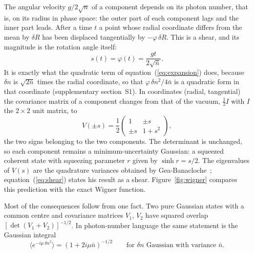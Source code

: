 \documentclass{iopjournal}
\newcommand{\nbar}{\bar{n}}
\begin{document}
The angular velocity $g/2\sqrt{n}$ of a component depends on its photon number, that is, on its radius in phase space: the outer part of each component lags and the inner part leads. After a time $t$ a point whose radial coordinate differs from the mean by $\delta R$ has been displaced tangentially by $-\varphi\,\delta R$. This is a shear, and its magnitude is the rotation angle itself:
\begin{equation}
s(t) = \varphi(t) = \frac{gt}{2\sqrt{\nbar}}.
\label{eq:s}
\end{equation}
It is exactly what the quadratic term of equation~(\ref{eq:expansion}) does, because $\delta n$ is $\sqrt{2\nbar}$ times the radial coordinate, so that $\varphi\,\delta n^2/4\nbar$ is a quadratic form in that coordinate (supplementary section~S1). In coordinates (radial, tangential) the covariance matrix of a component changes from that of the vacuum, $\tfrac{1}{2}I$ with $I$ the $2\times2$ unit matrix, to
\begin{equation}
V(\pm s) = \frac{1}{2}\begin{pmatrix} 1 & \pm s \\ \pm s & 1+s^2 \end{pmatrix},
\label{eq:shear}
\end{equation}
the two signs belonging to the two components. The determinant is unchanged, so each component remains a minimum-uncertainty Gaussian: a squeezed coherent state with squeezing parameter $r$ given by $\sinh r = s/2$. The eigenvalues of $V(s)$ are the quadrature variances obtained by Gea-Banacloche~\cite{gea-banacloche1991}; equation~(\ref{eq:shear}) states his result as a shear. Figure~\ref{fig:wigner} compares this prediction with the exact Wigner function.

Most of the consequences follow from one fact. Two pure Gaussian states with a common centre and covariance matrices $V_1$, $V_2$ have squared overlap $[\det(V_1+V_2)]^{-1/2}$. In photon-number language the same statement is the Gaussian integral
\begin{equation}
\big\langle e^{-i\mu\,\delta n^2}\big\rangle = (1+2i\mu\nbar)^{-1/2}\qquad\text{for $\delta n$ Gaussian with variance $\nbar$.}
\label{eq:lemma}
\end{equation}
\end{document}
